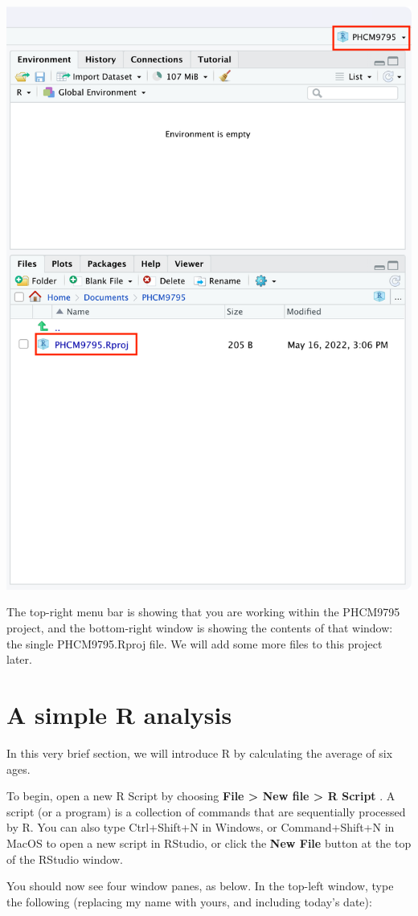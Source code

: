 \documentclass[
]{memoir}
\begin{document}
\includegraphics[width=0.75\linewidth]{img/NewProject-4}

The top-right menu bar is showing that you are working within the PHCM9795 project, and the bottom-right window is showing the contents of that window: the single PHCM9795.Rproj file. We will add some more files to this project later.

\hypertarget{simpleR}{%
\section{A simple R analysis}\label{simpleR}}

In this very brief section, we will introduce R by calculating the average of six ages.

To begin, open a new R Script by choosing \textbf{File \textgreater{} New file \textgreater{} R Script} . A script (or a program) is a collection of commands that are sequentially processed by R. You can also type Ctrl+Shift+N in Windows, or Command+Shift+N in MacOS to open a new script in RStudio, or click the \textbf{New File} button at the top of the RStudio window.

You should now see four window panes, as below. In the top-left window, type the following (replacing my name with yours, and including today's date):
\end{document}
